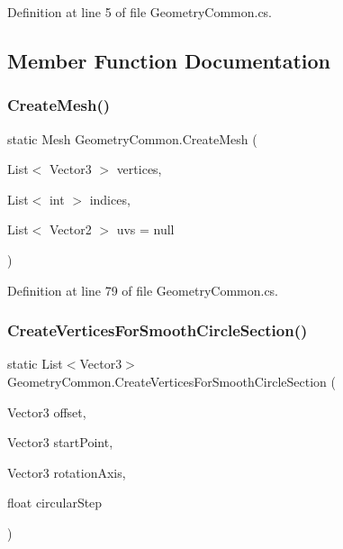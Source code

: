 Definition at line 5 of file Geometry\+Common.\+cs.



\subsection{Member Function Documentation}
\mbox{\label{class_geometry_common_a384bdf59b9cedb2ff13f7cd71db2663c}} 
\subsubsection{\texorpdfstring{CreateMesh()}{CreateMesh()}}
{\footnotesize\ttfamily static Mesh Geometry\+Common.\+Create\+Mesh (\begin{DoxyParamCaption}\item[{List$<$ Vector3 $>$}]{vertices,  }\item[{List$<$ int $>$}]{indices,  }\item[{List$<$ Vector2 $>$}]{uvs = {\ttfamily null} }\end{DoxyParamCaption})\hspace{0.3cm}{\ttfamily [static]}}



Definition at line 79 of file Geometry\+Common.\+cs.

\mbox{\label{class_geometry_common_adee2a9a148bfcd203fa8cf5a698e5dfc}} 
\subsubsection{\texorpdfstring{CreateVerticesForSmoothCircleSection()}{CreateVerticesForSmoothCircleSection()}}
{\footnotesize\ttfamily static List$<$Vector3$>$ Geometry\+Common.\+Create\+Vertices\+For\+Smooth\+Circle\+Section (\begin{DoxyParamCaption}\item[{Vector3}]{offset,  }\item[{Vector3}]{start\+Point,  }\item[{Vector3}]{rotation\+Axis,  }\item[{float}]{circular\+Step }\end{DoxyParamCaption})\hspace{0.3cm}{\ttfamily [static]}}



